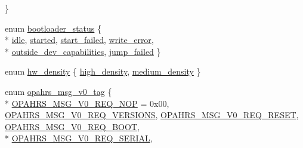 \begin{DoxyCompactItemize}
 \}
\item 
enum \hyperlink{group___p_i_o_s___o_p_a_h_r_s_gacd1b942d184c2de630e3264073bbe4ac}{bootloader\-\_\-status} \{ \\*
\hyperlink{group___p_i_o_s___o_p_a_h_r_s_ggacd1b942d184c2de630e3264073bbe4aca0e9a37114c0e458d28d52f06ec0f2242}{idle}, 
\hyperlink{group___p_i_o_s___o_p_a_h_r_s_ggacd1b942d184c2de630e3264073bbe4aca79ac82b7d6de0a99e1eb157abe0cc38d}{started}, 
\hyperlink{group___p_i_o_s___o_p_a_h_r_s_ggacd1b942d184c2de630e3264073bbe4acab731454e60a8640cf1cd63255f070162}{start\-\_\-failed}, 
\hyperlink{group___p_i_o_s___o_p_a_h_r_s_ggacd1b942d184c2de630e3264073bbe4aca9785acb84d9b164b052a2dabb8bfb54b}{write\-\_\-error}, 
\\*
\hyperlink{group___p_i_o_s___o_p_a_h_r_s_ggacd1b942d184c2de630e3264073bbe4acaf9bdd64c8ad3d6560b16872b0fa3840b}{outside\-\_\-dev\-\_\-capabilities}, 
\hyperlink{group___p_i_o_s___o_p_a_h_r_s_ggacd1b942d184c2de630e3264073bbe4aca3d1a1591b1e467b50fd557fe38957bf2}{jump\-\_\-failed}
 \}
\item 
enum \hyperlink{group___p_i_o_s___o_p_a_h_r_s_gad994e790427e07b69a993cb12d36059b}{hw\-\_\-density} \{ \hyperlink{group___p_i_o_s___o_p_a_h_r_s_ggad994e790427e07b69a993cb12d36059ba219dc185f053f8b4834a1ba8d933d5ad}{high\-\_\-density}, 
\hyperlink{group___p_i_o_s___o_p_a_h_r_s_ggad994e790427e07b69a993cb12d36059baf6076be9316ac6ba801343d471cb6ab4}{medium\-\_\-density}
 \}
\item 
enum \hyperlink{group___p_i_o_s___o_p_a_h_r_s_gaac8774f1c099b105b9117e7949bcf797}{opahrs\-\_\-msg\-\_\-v0\-\_\-tag} \{ \\*
\hyperlink{group___p_i_o_s___o_p_a_h_r_s_ggaac8774f1c099b105b9117e7949bcf797ac50be616a85d0f3f2b0ed72099dc0f98}{O\-P\-A\-H\-R\-S\-\_\-\-M\-S\-G\-\_\-\-V0\-\_\-\-R\-E\-Q\-\_\-\-N\-O\-P} = 0x00, 
\hyperlink{group___p_i_o_s___o_p_a_h_r_s_ggaac8774f1c099b105b9117e7949bcf797ab20ec687be76dec91393f2d1b8e90067}{O\-P\-A\-H\-R\-S\-\_\-\-M\-S\-G\-\_\-\-V0\-\_\-\-R\-E\-Q\-\_\-\-V\-E\-R\-S\-I\-O\-N\-S}, 
\hyperlink{group___p_i_o_s___o_p_a_h_r_s_ggaac8774f1c099b105b9117e7949bcf797ad88684dfb5f446e397d28e0e112db669}{O\-P\-A\-H\-R\-S\-\_\-\-M\-S\-G\-\_\-\-V0\-\_\-\-R\-E\-Q\-\_\-\-R\-E\-S\-E\-T}, 
\hyperlink{group___p_i_o_s___o_p_a_h_r_s_ggaac8774f1c099b105b9117e7949bcf797a3f98b938059a20605fdfc9e37f378416}{O\-P\-A\-H\-R\-S\-\_\-\-M\-S\-G\-\_\-\-V0\-\_\-\-R\-E\-Q\-\_\-\-B\-O\-O\-T}, 
\\*
\hyperlink{group___p_i_o_s___o_p_a_h_r_s_ggaac8774f1c099b105b9117e7949bcf797adabfb5e3aa2fe28eadd58b3c078d3ab1}{O\-P\-A\-H\-R\-S\-\_\-\-M\-S\-G\-\_\-\-V0\-\_\-\-R\-E\-Q\-\_\-\-S\-E\-R\-I\-A\-L}, 

\end{DoxyCompactItemize}

